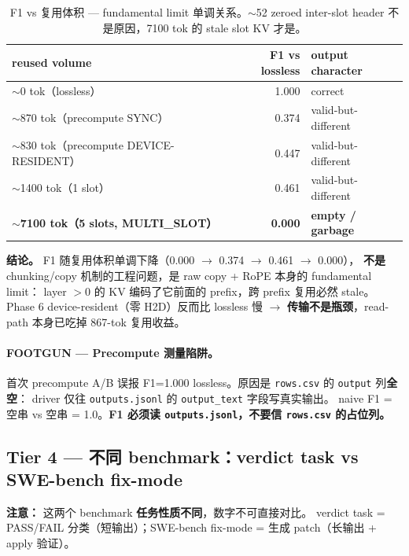 \documentclass[11pt,a4paper]{article}
\begin{document}
\begin{table}[h]
\centering\small
\begin{tabular}{@{}lrl@{}}
\toprule
\textbf{reused volume} & \textbf{F1 vs lossless} & \textbf{output character} \\
\midrule
$\sim$0 tok（lossless）                       & 1.000 & correct \\
$\sim$870 tok（precompute SYNC）              & 0.374 & valid-but-different \\
$\sim$830 tok（precompute DEVICE-RESIDENT）   & 0.447 & valid-but-different \\
$\sim$1400 tok（1 slot）                       & 0.461 & valid-but-different \\
\textbf{$\sim$7100 tok（5 slots, MULTI\_SLOT）} & \textbf{0.000} & \textbf{empty / garbage} \\
\bottomrule
\end{tabular}
\caption{F1 vs 复用体积 --- fundamental limit 单调关系。$\sim$52 zeroed inter-slot header 不是原因，7100 tok 的 stale slot KV 才是。}
\end{table}

\textbf{结论。} F1 随复用体积单调下降（0.000 $\to$ 0.374 $\to$ 0.461 $\to$ 0.000），
\textbf{不是} chunking/copy 机制的工程问题，是 raw copy + RoPE 本身的 fundamental limit：
layer $> 0$ 的 KV 编码了它前面的 prefix，跨 prefix 复用必然 stale。
Phase 6 device-resident（零 H2D）反而比 lossless 慢 $\to$ \textbf{传输不是瓶颈}，read-path 本身已吃掉 867-tok 复用收益。

\paragraph{FOOTGUN --- Precompute 测量陷阱。}
首次 precompute A/B 误报 F1=1.000 lossless。原因是 \texttt{rows.csv} 的 \texttt{output} 列\textbf{全空}：
driver 仅往 \texttt{outputs.jsonl} 的 \texttt{output\_text} 字段写真实输出。
naive F1 = 空串 vs 空串 = 1.0。\textbf{F1 必须读 \texttt{outputs.jsonl}，不要信 \texttt{rows.csv} 的占位列。}

\subsection*{Tier 4 --- 不同 benchmark：verdict task vs SWE-bench fix-mode}

\textbf{注意：} 这两个 benchmark \textbf{任务性质不同}，数字不可直接对比。
verdict task = PASS/FAIL 分类（短输出）；SWE-bench fix-mode = 生成 patch（长输出 + apply 验证）。
\end{document}
